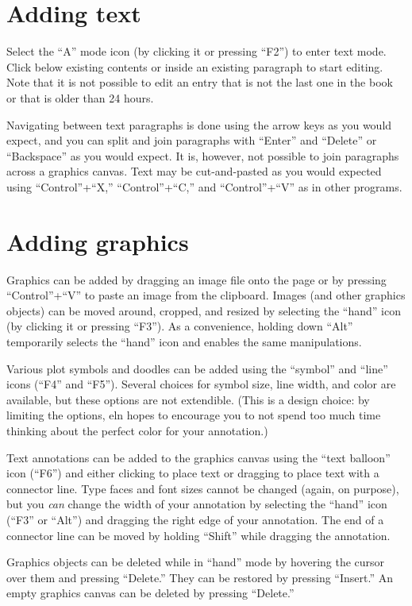 \documentclass[11pt]{report}
\begin{document}
\section{Adding text}

Select the ``A'' mode icon (by clicking it or pressing ``F2'') to
enter text mode. Click below existing contents or inside an existing
paragraph to start editing. Note that it is not possible to edit an
entry that is not the last one in the book or that is older than 24
hours.

Navigating between text paragraphs is done using the arrow keys as you
would expect, and you can split and join paragraphs with ``Enter'' and
``Delete'' or ``Backspace'' as you would expect. It is, however, not
possible to join paragraphs across a graphics canvas. Text may be
cut-and-pasted as you would expected using ``Control''+``X,''
``Control''+``C,'' and ``Control''+``V'' as in other programs.

\section{Adding graphics}

Graphics can be added by dragging an image file onto the page or by
pressing ``Control''+``V'' to paste an image from the
clipboard. Images (and other graphics objects) can be moved around, cropped, and resized by
selecting the ``hand'' icon (by clicking it or pressing ``F3''). As a
convenience, holding down ``Alt'' temporarily selects the ``hand''
icon and enables the same manipulations. 

Various plot symbols and doodles can be added using the ``symbol'' and
``line'' icons (``F4'' and ``F5''). Several choices for symbol size,
line width, and color are available, but these options are not
extendible. (This is a design choice: by limiting the options, eln
hopes to encourage you to not spend too much time thinking about the
perfect color for your annotation.) 

Text annotations can be added
to the graphics canvas using the ``text balloon'' icon (``F6'') and
either clicking to place text or dragging to place text with a
connector line. Type faces and font sizes cannot be changed (again, on
purpose), but you \emph{can} change the width of your annotation by
selecting the ``hand'' icon (``F3'' or ``Alt'') and dragging the right
edge of your annotation. The end of a connector line can be moved by
holding ``Shift'' while dragging the annotation.

Graphics objects can be deleted while in ``hand'' mode by hovering the
cursor over them and pressing ``Delete.'' They can be restored by
pressing ``Insert.'' An empty graphics canvas can be deleted by
pressing ``Delete.''
\end{document}
